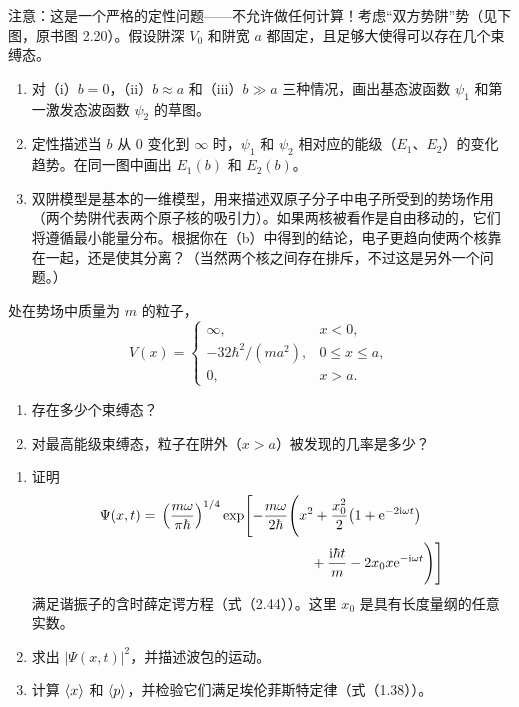 注意：这是一个严格的定性问题——不允许做任何计算！考虑“双方势阱”势（见下图，原书图 2.20）。假设阱深 $V_0$ 和阱宽 $a$ 都固定，且足够大使得可以存在几个束缚态。
\begin{enumerate}
\item 对（i）$b=0$，（ii）$b\approx a$ 和（iii）$b\gg a$ 三种情况，画出基态波函数 $\psi_1$ 和第一激发态波函数 $\psi_2$ 的草图。
\item 定性描述当 $b$ 从 $0$ 变化到 $\infty$ 时，$\psi_1$ 和 $\psi_2$ 相对应的能级（$E_1$、$E_2$）的变化趋势。在同一图中画出 $E_1(b)$ 和 $E_2(b)$。
\item 双阱模型是基本的一维模型，用来描述双原子分子中电子所受到的势场作用（两个势阱代表两个原子核的吸引力）。如果两核被看作是自由移动的，它们将遵循最小能量分布。根据你在（b）中得到的结论，电子更趋向使两个核靠在一起，还是使其分离？（当然两个核之间存在排斥，不过这是另外一个问题。）
\end{enumerate}
\begin{center}

\par{}
\end{center}
\vfill

处在势场中质量为 $m$ 的粒子，
\[
V(x)=\begin{cases}
\infty,&x<0,\\
-32\hbar^2/(ma^2),&0\leq x\leq a,\\
0,&x>a.
\end{cases}
\]
\begin{enumerate}
\item 存在多少个束缚态？
\item 对最高能级束缚态，粒子在阱外（$x>a$）被发现的几率是多少？
\end{enumerate}
\vfill

\begin{enumerate}
\item 证明
\[
\begin{split}
\Psi(x,t)={}&\left(\frac{m\omega}{\pi\hbar}\right)^{1/4}
\exp\Biggl[-\frac{m\omega}{2\hbar}\Biggl(
x^2+\frac{x_0^2}{2}\bigl(1+\mathrm{e}^{-2\mathrm{i}\omega t}\bigr)\\
&\hspace{38mm}+\frac{\mathrm{i}\hbar t}{m}-2x_0x\mathrm{e}^{-\mathrm{i}\omega t}
\Biggr)\Biggr]
\end{split}
\]
满足谐振子的含时薛定谔方程（式（2.44））。这里 $x_0$ 是具有长度量纲的任意实数。
\item 求出 $|\Psi(x,t)|^2$，并描述波包的运动。
\item 计算 $\left\langle x\right\rangle$ 和 $\left\langle p\right\rangle$，并检验它们满足埃伦菲斯特定律（式（1.38））。
\end{enumerate}
\vfill

